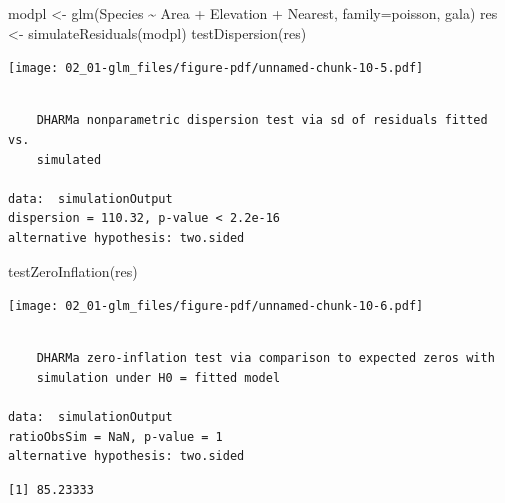 \documentclass[
  letterpaper,
  DIV=11,
  numbers=noendperiod]{scrreprt}
\newenvironment{Shaded}{\begin{snugshade}}{\end{snugshade}}
\newcommand{\AttributeTok}[1]{\textcolor[rgb]{0.40,0.45,0.13}{#1}}
\newcommand{\FunctionTok}[1]{\textcolor[rgb]{0.28,0.35,0.67}{#1}}
\newcommand{\NormalTok}[1]{\textcolor[rgb]{0.00,0.23,0.31}{#1}}
\newcommand{\OtherTok}[1]{\textcolor[rgb]{0.00,0.23,0.31}{#1}}
\newcommand{\SpecialCharTok}[1]{\textcolor[rgb]{0.37,0.37,0.37}{#1}}
\begin{document}
\begin{Shaded}
\begin{Highlighting}[]
\NormalTok{ modpl }\OtherTok{\textless{}{-}} \FunctionTok{glm}\NormalTok{(Species }\SpecialCharTok{\textasciitilde{}}\NormalTok{ Area }\SpecialCharTok{+}\NormalTok{ Elevation }\SpecialCharTok{+}\NormalTok{ Nearest, }\AttributeTok{family=}\NormalTok{poisson, gala)}
\NormalTok{res }\OtherTok{\textless{}{-}} \FunctionTok{simulateResiduals}\NormalTok{(modpl)}
\FunctionTok{testDispersion}\NormalTok{(res)}
\end{Highlighting}
\end{Shaded}

\texttt{[image: 02\_01-glm\_files/figure-pdf/unnamed-chunk-10-5.pdf]}

\begin{verbatim}

    DHARMa nonparametric dispersion test via sd of residuals fitted vs.
    simulated

data:  simulationOutput
dispersion = 110.32, p-value < 2.2e-16
alternative hypothesis: two.sided
\end{verbatim}

\begin{Shaded}
\begin{Highlighting}[]
\FunctionTok{testZeroInflation}\NormalTok{(res)}
\end{Highlighting}
\end{Shaded}

\texttt{[image: 02\_01-glm\_files/figure-pdf/unnamed-chunk-10-6.pdf]}

\begin{verbatim}

    DHARMa zero-inflation test via comparison to expected zeros with
    simulation under H0 = fitted model

data:  simulationOutput
ratioObsSim = NaN, p-value = 1
alternative hypothesis: two.sided
\end{verbatim}

\begin{Shaded}
\end{Shaded}

\begin{verbatim}
[1] 85.23333
\end{verbatim}

\begin{Shaded}
\end{Shaded}
\end{document}
